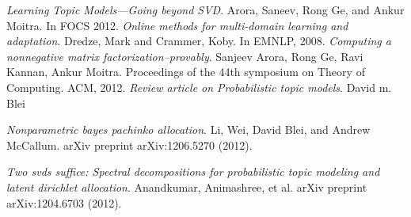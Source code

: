 \documentclass[a4paper,11pt]{article}
\begin{document}
\begin{thebibliography}{99}
 \textit{Learning Topic Models---Going beyond SVD}. Arora, Saneev, Rong Ge, and Ankur Moitra. In FOCS 2012.
 \textit{Online methods for multi-domain learning and adaptation}. Dredze, Mark and Crammer, Koby. In
EMNLP, 2008.
 \textit{Computing a nonnegative matrix factorization--provably}. Sanjeev Arora, Rong Ge, Ravi Kannan, Ankur Moitra. Proceedings of the 44th symposium on Theory of Computing. ACM, 2012.  
 \textit{Review article on Probabilistic topic models}. David m. Blei  

 \textit{Nonparametric bayes pachinko allocation}. Li, Wei, David Blei, and Andrew McCallum. arXiv preprint arXiv:1206.5270 (2012). 

 \textit{Two svds suffice: Spectral decompositions for probabilistic topic modeling and latent dirichlet allocation}. Anandkumar, Animashree, et al.  arXiv preprint arXiv:1204.6703 (2012).



\end{thebibliography}

\pagebreak
\end{document}

